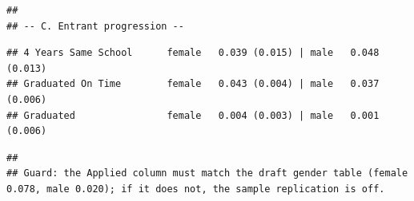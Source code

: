 \documentclass[
]{article}
\begin{document}
\begin{verbatim}
## 
## -- C. Entrant progression --
\end{verbatim}

\begin{verbatim}
## 4 Years Same School      female   0.039 (0.015) | male   0.048 (0.013)
## Graduated On Time        female   0.043 (0.004) | male   0.037 (0.006)
## Graduated                female   0.004 (0.003) | male   0.001 (0.006)
\end{verbatim}

\begin{verbatim}
## 
## Guard: the Applied column must match the draft gender table (female 0.078, male 0.020); if it does not, the sample replication is off.
\end{verbatim}
\end{document}
